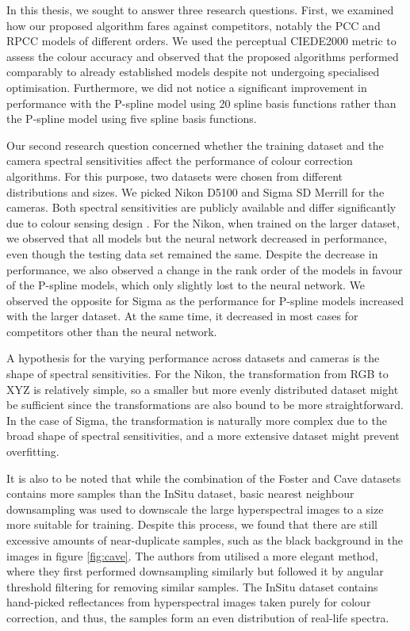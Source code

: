 In this thesis, we sought to answer three research questions. First, we examined how our proposed algorithm fares against competitors, notably the PCC and RPCC models of different orders. We used the perceptual CIEDE2000 metric to assess the colour accuracy and observed that the proposed algorithms performed comparably to already established models despite not undergoing specialised optimisation. Furthermore, we did not notice a significant improvement in performance with the P-spline model using 20 spline basis functions rather than the P-spline model using five spline basis functions.

Our second research question concerned whether the training dataset and the camera spectral sensitivities affect the performance of colour correction algorithms. For this purpose, two datasets were chosen from different distributions and sizes. We picked Nikon D5100 and Sigma SD Merrill for the cameras. Both spectral sensitivities are publicly available and differ significantly due to colour sensing design \cite{D5100NPL}. For the Nikon, when trained on the larger dataset, we observed that all models but the neural network decreased in performance, even though the testing data set remained the same. Despite the decrease in performance, we also observed a change in the rank order of the models in favour of the P-spline models, which only slightly lost to the neural network. We observed the opposite for Sigma as the performance for P-spline models increased with the larger dataset. At the same time, it decreased in most cases for competitors other than the neural network.

A hypothesis for the varying performance across datasets and cameras is the shape of spectral sensitivities. For the Nikon, the transformation from RGB to XYZ is relatively simple, so a smaller but more evenly distributed dataset might be sufficient since the transformations are also bound to be more straightforward. In the case of Sigma, the transformation is naturally more complex due to the broad shape of spectral sensitivities, and a more extensive dataset might prevent overfitting.

It is also to be noted that while the combination of the Foster and Cave datasets contains more samples than the InSitu dataset, basic nearest neighbour downsampling was used to downscale the large hyperspectral images to a size more suitable for training. Despite this process, we found that there are still excessive amounts of near-duplicate samples, such as the black background in the images in figure \ref{fig:cave}. The authors from \cite{kucuk2023performance} utilised a more elegant method, where they first performed downsampling similarly but followed it by angular threshold filtering for removing similar samples. The InSitu dataset contains hand-picked reflectances from hyperspectral images taken purely for colour correction, and thus, the samples form an even distribution of real-life spectra.

